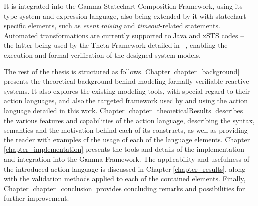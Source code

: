 It is integrated into the Gamma Statechart Composition Framework, using its type system and expression language, also being extended by it with statechart-specific elements, such as \textit{event raising} and \textit{timeout}-related statements. Automated transformations are currently supported to Java and xSTS codes -- the latter being used by the Theta Framework detailed in \cite{ThetaToolPaper} --, enabling the execution and formal verification of the designed system models.

The rest of the thesis is structured as follows. Chapter \ref{chapter_background} presents the theoretical background behind modeling formally verifiable reactive systems. It also explores the existing modeling tools, with special regard to their action languages, and also the targeted framework used by and using the action language detailed in this work. Chapter \ref{chapter_theoreticalResults} describes the various features and capabilities of the action language, describing the syntax, semantics and the motivation behind each of its constructs, as well as providing the reader with examples of the usage of each of the language elements. Chapter \ref{chapter_implementation} presents the tools and details of the implementation and integration into the Gamma Framework. The applicability and usefulness of the introduced action language is discussed in Chapter \ref{chapter_results}, along with the validation methods applied to each of the contained elements. Finally, Chapter \ref{chapter_conclusion} provides concluding remarks and possibilities for further improvement.